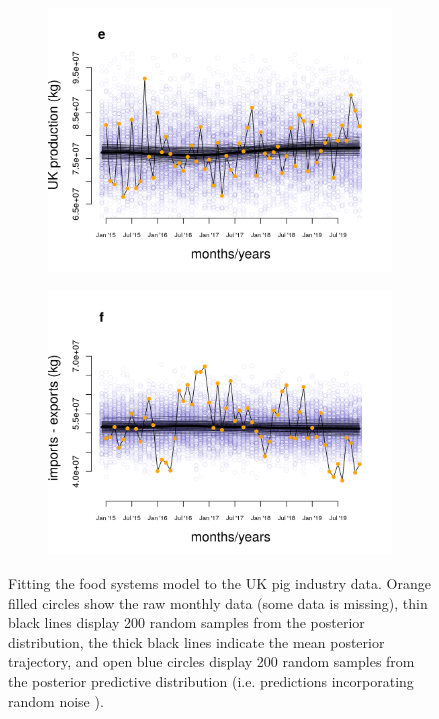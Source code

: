 \documentclass[12pt]{article}
\begin{document}
\begin{figure}[t!]
  \begin{subfigure}{0.5\textwidth}
    \includegraphics[scale=0.5]{figure_3e.png}
  \end{subfigure}%
  \begin{subfigure}{0.5\textwidth}
    \includegraphics[scale=0.5]{figure_3f.png}
  \end{subfigure}
  \caption{Fitting the food systems model to the UK pig industry data. Orange filled circles show the raw monthly data (some data is missing), thin black lines display 200 random samples from the posterior distribution, the thick black lines indicate the mean posterior trajectory, and open blue circles display 200 random samples from the posterior predictive distribution (i.e. predictions incorporating random noise ).}
  \label{fig_posterior_predictions}
\end{figure}
\end{document}

